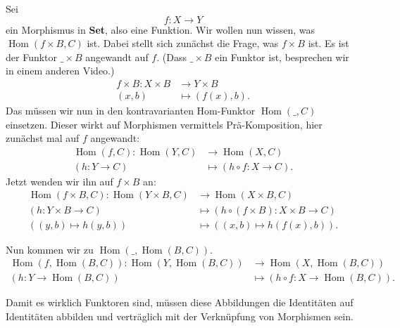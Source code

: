 \documentclass[a4paper]{amsart}
\theoremstyle{definition}
\DeclareMathOperator{\Hom}{Hom}
\begin{document}
Sei
\begin{equation}
   f \colon X \to Y
\end{equation}
ein Morphismus in \textbf{Set}, also eine Funktion. Wir wollen nun wissen, was $\Hom( f \times B, C )$ ist. Dabei stellt sich zunächst die Frage, was $f \times B$ ist. Es ist der Funktor $\_ \times B$ angewandt auf $f$. (Dass  $\_ \times B$ ein Funktor ist, besprechen wir in einem anderen Video.)
\begin{align}
   f \times B \colon X \times B &\to Y \times B\\
   (x,b) &\mapsto (f(x), b).
\end{align}
Das müssen wir nun in den kontravarianten Hom-Funktor $\Hom( \_, C)$ einsetzen. Dieser wirkt auf Morphismen vermittels Prä-Komposition, hier zunächst mal auf $f$ angewandt:
\begin{align}
   \Hom(f, C) \colon \Hom( Y, C ) &\to \Hom( X, C)\\
   (h \colon Y \to C) &\mapsto (h \circ f \colon X \to C).
\end{align}
Jetzt wenden wir ihn auf $f \times B$ an:
\begin{align}
   \Hom(f \times B, C) \colon \Hom( Y \times B, C ) &\to \Hom( X \times B, C)\\
   (h \colon Y \times B \to C) &\mapsto (h \circ (f \times B) \colon X \times B \to C)\\
   ((y,b) \mapsto h(y, b)) &\mapsto ((x,b) \mapsto h(f(x),b)).
\end{align}

Nun kommen wir zu $\Hom( \_, \Hom( B, C))$.
\begin{align}
   \Hom( f, \Hom( B, C)) \colon \Hom(Y, \Hom( B, C)) &\to \Hom(X, \Hom( B, C))\\
   (h \colon Y \to \Hom( B, C) ) &\mapsto (h \circ f \colon X \to \Hom( B, C)).
\end{align}

Damit es wirklich Funktoren sind, müssen diese Abbildungen die Identitäten auf Identitäten abbilden und verträglich mit der Verknüpfung von Morphismen sein.

\end{document}
